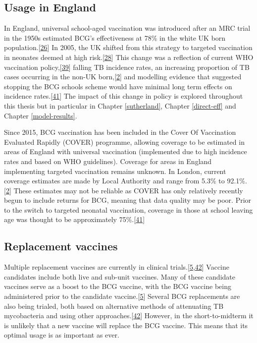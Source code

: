 \documentclass[11pt,twoside]{bristolthesis}
\begin{document}
  \hypertarget{usage-in-england}{%
  \subsection{Usage in England}\label{usage-in-england}}
  
  In England, universal school-aged vaccination was introduced after an MRC trial in the 1950s estimated BCG's effectiveness at 78\% in the white UK born population.{[}\protect\hyperlink{ref-Hart1972}{26}{]} In 2005, the UK shifted from this strategy to targeted vaccination in neonates deemed at high risk.{[}\protect\hyperlink{ref-Abubakar2013}{28}{]} This change was a reflection of current WHO vaccination policy,{[}\protect\hyperlink{ref-WHO2017}{39}{]} falling TB incidence rates, an increasing proportion of TB cases occurring in the non-UK born,{[}\protect\hyperlink{ref-PHE2017}{2}{]} and modelling evidence that suggested stopping the BCG schools scheme would have minimal long term effects on incidence rates.{[}\protect\hyperlink{ref-Sutherland1989}{41}{]} The impact of this change in policy is explored throughout this thesis but in particular in Chapter \ref{sutherland}, Chapter \ref{direct-eff} and Chapter \ref{model-results}.
  
  Since 2015, BCG vaccination has been included in the Cover Of Vaccination Evaluated Rapidly (COVER) programme, allowing coverage to be estimated in areas of England with universal vaccination (implemented due to high incidence rates and based on WHO guidelines). Coverage for areas in England implementing targeted vaccination remains unknown. In London, current coverage estimates are made by Local Authority and range from 5.3\% to 92.1\%.{[}\protect\hyperlink{ref-PHE2017}{2}{]} These estimates may not be reliable as COVER has only relatively recently begun to include returns for BCG, meaning that data quality may be poor. Prior to the switch to targeted neonatal vaccination, coverage in those at school leaving age was thought to be approximately 75\%.{[}\protect\hyperlink{ref-Sutherland1989}{41}{]}
  
  \hypertarget{replacement-vaccines}{%
  \subsection{Replacement vaccines}\label{replacement-vaccines}}
  
  Multiple replacement vaccines are currently in clinical trials.{[}\protect\hyperlink{ref-Zwerling2011a}{5},\protect\hyperlink{ref-Schrager:2018ip}{42}{]} Vaccine candidates include both live and sub-unit vaccines. Many of these candidate vaccines serve as a boost to the BCG vaccine, with the BCG vaccine being administered prior to the candidate vaccine.{[}\protect\hyperlink{ref-Zwerling2011a}{5}{]} Several BCG replacements are also being trialed, both based on alternative methods of attenuating TB mycobacteria and using other approaches.{[}\protect\hyperlink{ref-Schrager:2018ip}{42}{]} However, in the short-to-midterm it is unlikely that a new vaccine will replace the BCG vaccine. This means that its optimal usage is as important as ever.
  
\end{document}

